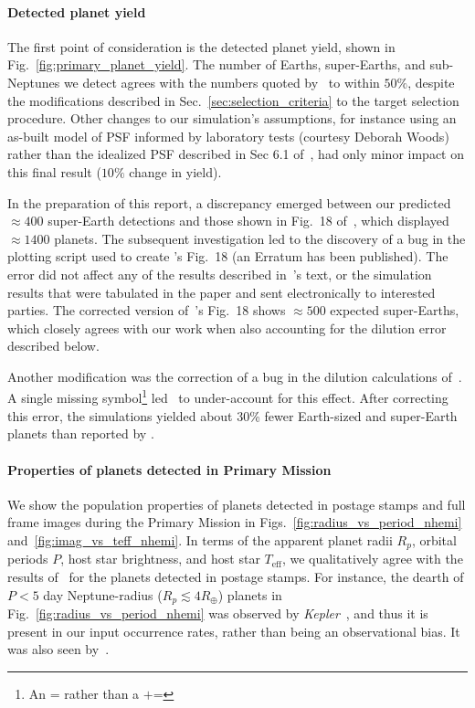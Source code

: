 \paragraph{Detected planet yield}
The first point of consideration is the detected planet yield, shown in Fig.~\ref{fig:primary_planet_yield}.
The number of Earths, super-Earths, and sub-Neptunes we detect agrees with the 
numbers quoted by~ to within $50\%$, despite the 
modifications described in Sec.~\ref{sec:selection_criteria} to the target 
selection procedure.
Other changes to our simulation's assumptions, for instance using an as-built 
model of \tesss PSF informed by laboratory tests (courtesy Deborah Woods) 
rather than the idealized PSF described in Sec 6.1 
of~, had only minor impact on this final result 
($10\%$ change in yield).

In the preparation of this report, a
discrepancy emerged between our predicted $\approx 400$ super-Earth detections 
and those shown in Fig.~18 of~, which 
displayed $\approx1400$ planets. The subsequent investigation led to the 
discovery of a bug in the plotting script used to create 
's Fig.~18 (an Erratum has been published). The 
error did not
affect any of the results described in~'s text, or 
the simulation results that were tabulated in the paper and sent electronically 
to interested parties.
The corrected version 
of~'s Fig.~18 shows $\approx 500$ expected 
super-Earths, which closely agrees with our work when also accounting for the 
dilution error described below.

Another modification was the correction of a bug in the dilution calculations
of~. A single missing symbol\footnote{An $\texttt{=}$ rather than 
a $\texttt{+=}$} led~ to under-account for this 
effect. After correcting this error, the simulations yielded
about 30\% fewer Earth-sized and super-Earth planets than reported by .

\paragraph{Properties of planets detected in Primary Mission} 

We show the population properties of planets detected in postage
stamps and full frame images during the Primary Mission in
Figs.~\ref{fig:radius_vs_period_nhemi}
and~\ref{fig:imag_vs_teff_nhemi}.  In terms of the apparent planet
radii $R_p$, orbital periods $P$, host star brightness, and host star
$T_\mathrm{eff}$, we qualitatively agree with the results
of~ for the planets detected
in postage stamps. 
For instance, the dearth of $P<5$ day
Neptune-radius ($R_p \lesssim 4R_\oplus$) planets in 
Fig.~\ref{fig:radius_vs_period_nhemi} was
observed by \textit{Kepler}~\citep{mazeh_dearth_2016}, and thus it is
present in our input occurrence rates, rather than being an
observational bias.  It was also seen by~.

